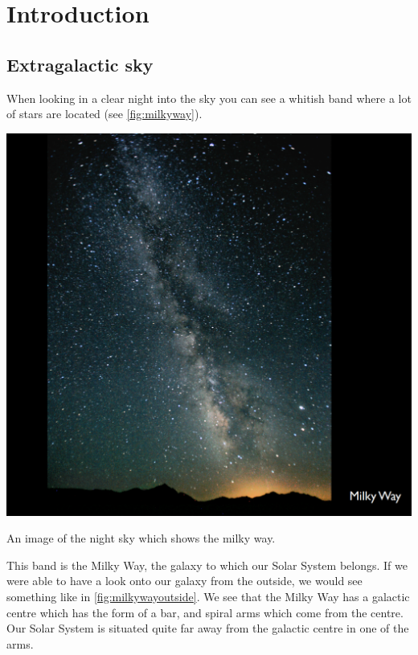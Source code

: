 \chapter{Introduction}

\section{Extragalactic sky}
When looking in a clear night into the sky you can see a whitish band where a lot of stars are located (see \cref{fig:milkyway}). 
\begin{marginfigure}
	\centering
		\includegraphics[width=\textwidth]{img/ch-01/milkyway.png}
		\caption{An image of the night sky which shows the milky way.}
		\label{fig:milkyway}
\end{marginfigure}
This band is the Milky Way, the galaxy to which our Solar System belongs. If we were able to have a look onto our galaxy from the outside, we would see something like in \cref{fig:milkywayoutside}. We see that the Milky Way has a galactic centre which has the form of a bar, and spiral arms which come from the centre. Our Solar System is situated quite far away from the galactic centre in one of the arms. 
